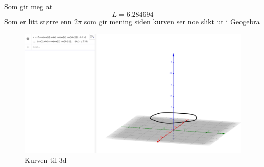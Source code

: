 \documentclass[a4paper,10pt,norsk]{article}
\begin{document}
	Som gir meg at \[
	L = 6.284694
	\] 
	Som er litt større enn $2 \pi$ som gir mening siden kurven ser noe slikt ut i Geogebra
	\begin{figure}[h!]
		\centering
		\caption{Kurven til 3d}
		\label{fig:3d}
		\includegraphics[scale=0.18]{3d.png}
	\end{figure}
	\newpage
\end{document}
